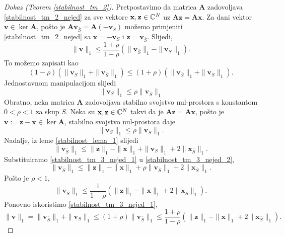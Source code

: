 \documentclass[a4paper,twoside,12pt]{memoir} %
\newcommand{\vect}[1]{\mathbf{#1}}
\renewcommand{\vec}{\vect}
\newcommand{\norm}[1]{\|{#1}\|}
\begin{document}
\begin{proof}[Dokaz (Teorem \ref{stabilnost_tm_2})]
    Pretpostavimo da matrica $\vec A$ zadovoljava \eqref{stabilnost_tm_2_nejed} za sve vektore $\vec x, \vec z \in \C^N$ uz $\vec{Az} = \vec{Ax}$. Za dani vektor $\vec{v} \in \ker \vec A$, po\v{s}to je $\vec{Av}_{\bar S} = \vec A(-\vec v_S)$ mo\v{z}emo primjeniti \eqref{stabilnost_tm_2_nejed} sa $\vec x = - \vec v_S$ i $\vec z = \vec v_{\bar S}$. Slijedi,
    \begin{equation*}
        \norm{\vec v}_1 \leq \frac{1+\rho}{1-\rho}(\norm{\vec v_{\bar S}}_1 - \norm{\vec v_S}_1). 
    \end{equation*}
    To mo\v{z}emo zapisati kao 
    \begin{equation*}
        (1-\rho)(\norm{\vec v_S}_1 + \norm{\vec v_{\bar S}}_1)  \leq  (1+\rho)(\norm{\vec v_{\bar S}}_1 + \norm{\vec v_S}_1).
    \end{equation*}
    Jednostavnom manipulacijom slijedi
    \begin{equation*}
        \norm{\vec v_S}_1 \leq \rho \norm{\vec v_{\bar S}}_1 
    \end{equation*}
    \indent
    Obratno, neka matrica $\vec A$ zadovoljava stabilno svojstvo nul-prostora s konstantom $0<\rho<1$ za skup $S$. Neka su $\vec x, \vec z \in \C^N$ takvi da je $\vec{Az} = \vec{Ax}$, po\v{s}to je $\vec v := \vec z - \vec x \in \ker \vec A$, stabilno svojstvo nul-prostora daje
    \begin{equation}\label{stabilnost_tm_3_nejed_1}
        \norm{\vec v_S}_1 \leq \rho \norm{\vec v_{\bar S}}_1.
    \end{equation}
    Nadalje, iz leme \ref{stabilnost_lema_1} slijedi
    \begin{equation}\label{stabilnost_tm_3_nejed_2}
        \norm{\vec v_{\bar S}}_1  \leq \norm{\vec z}_1 - \norm{\vec x}_1 + \norm{\vec v_S}_1 + 2 \norm{\vec x_{\bar S}}_1.
    \end{equation}
    Substituiramo \eqref{stabilnost_tm_3_nejed_1} u \eqref{stabilnost_tm_3_nejed_2},
    \begin{equation*}
        \norm{\vec v_{\bar S}}_1  \leq \norm{\vec z}_1 - \norm{\vec x}_1 + \rho\norm{\vec v_{\bar S}}_1 + 2 \norm{\vec x_{\bar S}}_1.
    \end{equation*}
    Po\v{s}to je $\rho < 1$,
    \begin{equation*}
        \norm{\vec v_{\bar S}}_1 \leq \frac{1}{1 - \rho}(\norm{\vec z}_1 - \norm{\vec x}_1 + 2\norm{\vec x_{\bar S}}_1).  
    \end{equation*}
    Ponovno iskoristimo \eqref{stabilnost_tm_3_nejed_1},
    \begin{equation*}
        \norm{\vec v}_1 = \norm{\vec v_{\bar S}}_1 +  \norm{\vec v_{S}}_1  \leq (1 + \rho) \norm{\vec v_{\bar S}}_1 \leq \frac{1+\rho}{1-\rho}(\norm{\vec z}_1 - \norm{\vec x}_1 + 2 \norm{\vec x_{\bar S}}_1).
    \end{equation*}
\end{proof}
\end{document}
